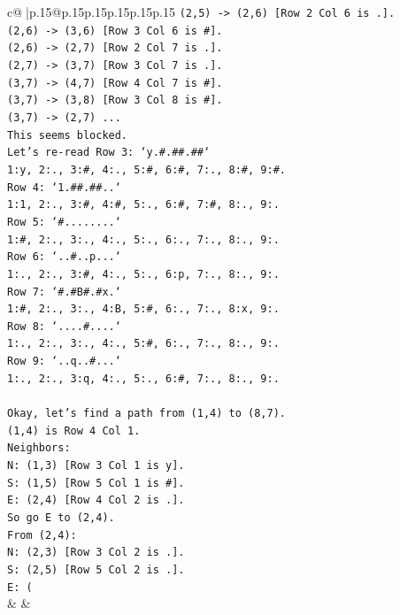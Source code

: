 \documentclass{article}
\begin{document}
{\begin{supertabular}{c@{$\;$}|p{.15\linewidth}@{}p{.15\linewidth}p{.15\linewidth}p{.15\linewidth}p{.15\linewidth}p{.15\linewidth}}
{{{\texttt{(2,5) {-}> (2,6) {[}Row 2 Col 6 is .{]}.} \\
\texttt{(2,6) {-}> (3,6) {[}Row 3 Col 6 is \#{]}.} \\
\texttt{(2,6) {-}> (2,7) {[}Row 2 Col 7 is .{]}.} \\
\texttt{(2,7) {-}> (3,7) {[}Row 3 Col 7 is .{]}.} \\
\texttt{(3,7) {-}> (4,7) {[}Row 4 Col 7 is \#{]}.} \\
\texttt{(3,7) {-}> (3,8) {[}Row 3 Col 8 is \#{]}.} \\
\texttt{(3,7) {-}> (2,7) ...} \\
\texttt{This seems blocked.} \\
\texttt{Let's re{-}read Row 3: `y.\#.\#\#.\#\#`} \\
\texttt{1:y, 2:., 3:\#, 4:., 5:\#, 6:\#, 7:., 8:\#, 9:\#.} \\
\texttt{Row 4: `1.\#\#.\#\#..`} \\
\texttt{1:1, 2:., 3:\#, 4:\#, 5:., 6:\#, 7:\#, 8:., 9:.} \\
\texttt{Row 5: `\#........`} \\
\texttt{1:\#, 2:., 3:., 4:., 5:., 6:., 7:., 8:., 9:.} \\
\texttt{Row 6: `..\#..p...`} \\
\texttt{1:., 2:., 3:\#, 4:., 5:., 6:p, 7:., 8:., 9:.} \\
\texttt{Row 7: `\#.\#B\#.\#x.`} \\
\texttt{1:\#, 2:., 3:., 4:B, 5:\#, 6:., 7:., 8:x, 9:.} \\
\texttt{Row 8: `....\#....`} \\
\texttt{1:., 2:., 3:., 4:., 5:\#, 6:., 7:., 8:., 9:.} \\
\texttt{Row 9: `..q..\#...`} \\
\texttt{1:., 2:., 3:q, 4:., 5:., 6:\#, 7:., 8:., 9:.} \\
\\ 
\texttt{Okay, let's find a path from (1,4) to (8,7).} \\
\texttt{(1,4) is Row 4 Col 1.} \\
\texttt{Neighbors:} \\
\texttt{N: (1,3) {[}Row 3 Col 1 is y{]}.} \\
\texttt{S: (1,5) {[}Row 5 Col 1 is \#{]}.} \\
\texttt{E: (2,4) {[}Row 4 Col 2 is .{]}.} \\
\texttt{So go E to (2,4).} \\
\texttt{From (2,4):} \\
\texttt{N: (2,3) {[}Row 3 Col 2 is .{]}.} \\
\texttt{S: (2,5) {[}Row 5 Col 2 is .{]}.} \\
\texttt{E: (} \\
            }
        }
    }
    & & \\ \\


\end{supertabular}}
\end{document}
